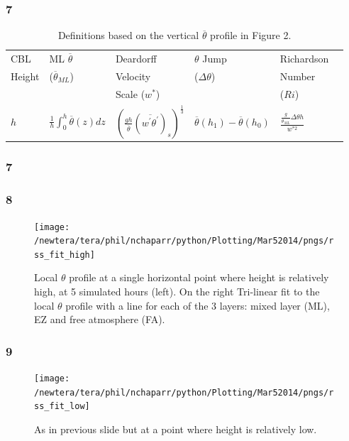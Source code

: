 \documentclass{beamer}
\newcommand\FrameText[1]{
\begin{textblock}{16}(1,2.5)
\raggedright #1
\end{textblock}}
\begin{document}
\begin{frame}
\frametitle{7}
\begin{table}[htbp]
\caption[]{Definitions based on the vertical $\overline{\theta}$ profile in Figure 2.}
    \begin{center}
    \begin{tabular}{ p{1cm} p{2cm} p{2cm}  p{2cm}  p{2cm} p{2.5cm} }
      CBL& ML $\overline{\theta}$ & Deardorff & $\theta$ Jump &Richardson\\
      Height&($\overline{\theta}_{ML}$)&Velocity&($\Delta \theta$)&Number\\
            &&Scale ($w^{*}$)&&($Ri$) \\ \hline 
       $h$  &$\frac{1}{h}\int^{h}_{0}\overline{\theta}(z)dz$ & $\left( \frac{gh}{\overline{\theta}}(\overline{w^{'}\theta^{'}})_{s} \right)^{\frac{1}{3}}$& $\overline{\theta}(h_{1})-\overline{\theta}(h_{0})$ & $\frac{\frac{g}{\overline{\theta}_{ML}}\Delta \theta h}{w^{*2}}$  \\ [.3cm] \hline
      \end{tabular}
\label{tab:reldefs}   
\end{center}    
\end{table}
\end{frame}

\begin{frame}
\frametitle{7}
 \begin{figure}[ht]
 \end{figure}
\end{frame}

\begin{frame}
\frametitle{8}
\fontsize{12pt}{7.2}\selectfont
\begin{figure}
\centering
\texttt{[image: /newtera/tera/phil/nchaparr/python/Plotting/Mar52014/pngs/rss\_fit\_high]}
\caption{Local $\theta$ profile at a single horizontal point where height is relatively high, at 5 simulated hours (left).  On the right Tri-linear fit to the local $\theta$ profile with a line for each of the 3 layers: mixed layer (ML), EZ and free atmosphere (FA).}
\end{figure}
\end{frame}

\begin{frame}
\frametitle{9}

\begin{figure}
\fontsize{12pt}{7.2}\selectfont
\centering
\texttt{[image: /newtera/tera/phil/nchaparr/python/Plotting/Mar52014/pngs/rss\_fit\_low]}
\caption{As in previous slide but at a point where height is relatively low.}
\end{figure}
\end{frame}
\end{document}
